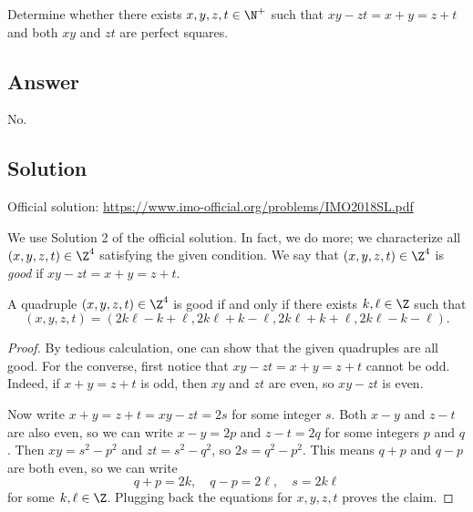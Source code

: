 Determine whether there exists $x, y, z, t \in \N^+$ such that $xy - zt = x + y = z + t$ and both $xy$ and $zt$ are perfect squares.



\subsection*{Answer}

No.



\subsection*{Solution}

Official solution: \url{https://www.imo-official.org/problems/IMO2018SL.pdf}

We use Solution 2 of the official solution.
In fact, we do more; we characterize all $(x, y, z, t) \in \Z^4$ satisfying the given condition.
We say that $(x, y, z, t) \in \Z^4$ is \emph{good} if $xy - zt = x + y = z + t$.

\begin{claim}
A quadruple $(x, y, z, t) \in \Z^4$ is good if and only if there exists $k, \ell \in \Z$ such that
\[ (x, y, z, t) = (2k \ell - k + \ell, 2k \ell + k - \ell, 2k \ell + k + \ell, 2k \ell - k - \ell). \]
\end{claim}
\begin{proof}
By tedious calculation, one can show that the given quadruples are all good.
For the converse, first notice that $xy - zt = x + y = z + t$ cannot be odd.
Indeed, if $x + y = z + t$ is odd, then $xy$ and $zt$ are even, so $xy - zt$ is even.

Now write $x + y = z + t = xy - zt = 2s$ for some integer $s$.
Both $x - y$ and $z - t$ are also even, so we can write $x - y = 2p$ and $z - t = 2q$ for some integers $p$ and $q$.
Then $xy = s^2 - p^2$ and $zt = s^2 - q^2$, so $2s = q^2 - p^2$.
This means $q + p$ and $q - p$ are both even, so we can write
\[ q + p = 2k, \quad q - p = 2 \ell, \quad s = 2k \ell \]
    for some $k, \ell \in \Z$.
Plugging back the equations for $x, y, z, t$ proves the claim.
\end{proof}

